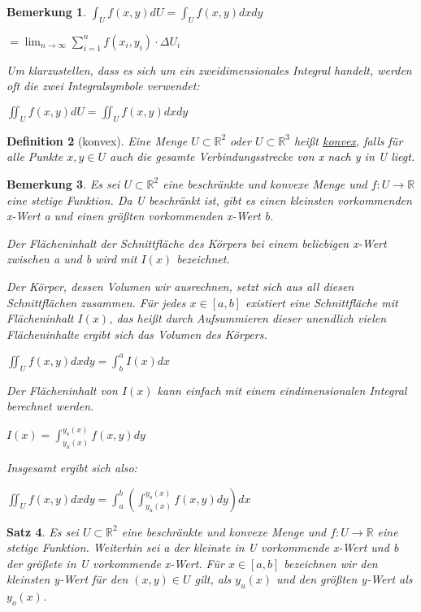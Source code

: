 \documentclass[fontset=ubuntu,11pt,a4paper,fleqn,headsepline]{scrreprt}
\newtheorem{defi}{Definition}[section]
\newtheorem{bemerkung}[defi]{Bemerkung}
\newtheorem{satz}[defi]{Satz}
\begin{document}
\begin{multicols}{2}
\begin{bemerkung}
            \(\int_{U} f(x,y)dU=\int_{U} f(x,y)dxdy\)
    
            \(= \lim_{n\to\infty} \sum^{n}_{i=1} f(x_i,y_i)\cdot\Delta U_i\)
    
            Um klarzustellen, dass es sich um ein zweidimensionales Integral handelt, werden oft die zwei Integralsymbole verwendet:
    
            \(\iint_{U} f(x,y)dU=\iint_{U} f(x,y)dxdy\)
        \end{bemerkung}
    
        \begin{defi}[konvex]
            Eine Menge \(U\subset\mathbb{R}^2\) oder \(U\subset\mathbb{R}^3\) heißt \underline{konvex}, falls für alle Punkte \(x,y\in U\) auch die gesamte Verbindungsstrecke von x nach y in U liegt.
        \end{defi}
    
        \begin{bemerkung}
            Es sei \(U\subset\mathbb{R}^2\) eine beschränkte und konvexe Menge und \(f:U\to\mathbb{R}\) eine stetige Funktion. Da U beschränkt ist, gibt es einen kleinsten vorkommenden x-Wert a und einen größten vorkommenden x-Wert b.
    
            Der Flächeninhalt der Schnittfläche des Körpers bei einem beliebigen x-Wert zwischen a und b wird mit \(I(x)\) bezeichnet.
    
            Der Körper, dessen Volumen wir ausrechnen, setzt sich aus all diesen Schnittflächen zusammen. Für jedes \(x\in [a,b]\) existiert eine Schnittfläche mit Flächeninhalt \(I(x)\), das heißt durch Aufsummieren dieser unendlich vielen Flächeninhalte ergibt sich das Volumen des Körpers.
    
            \(\iint_U f(x,y)dxdy = \int^a_b I(x)dx\)
    
            Der Flächeninhalt von \(I(x)\) kann einfach mit einem eindimensionalen Integral berechnet werden.
    
            \(I(x) = \int^{y_o(x)}_{y_u(x)} f(x,y)dy\)
    
            Insgesamt ergibt sich also:
    
            \(\iint_U f(x,y)dxdy = \int^b_a \left(\int^{y_o(x)}_{y_u(x)} f(x,y)dy\right)dx\)
        \end{bemerkung}
    
        \begin{satz}
            Es sei \(U\subset\mathbb{R}^2\) eine beschränkte und konvexe Menge und \(f:U\to\mathbb{R}\) eine stetige Funktion. Weiterhin sei a der kleinste in U vorkommende x-Wert und b der größete in U vorkommende x-Wert. Für \(x\in [a,b]\) bezeichnen wir den kleinsten y-Wert für den \((x,y) \in U\) gilt, als \(y_u(x)\) und den größten y-Wert als \(y_o(x)\).
    

\end{satz}
\end{multicols}
\end{document}
